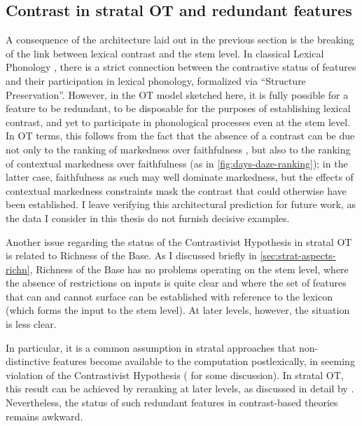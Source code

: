 \subsection{Contrast in stratal OT and redundant features}
\label{sec:contrast-stratal-ot}

A consequence of the architecture laid out in the previous section is the breaking of the link between lexical contrast and the stem level. In classical Lexical Phonology \citep{kiparsky82:_lexic_phonol_morph,kiparsky85:_some_lexic_phonol,kiparsky95}, there is a strict connection between the contrastive status of features and their participation in lexical phonology, formalized via \enquote{Structure Preservation}. However, in the OT model sketched here, it is fully possible for a feature to be redundant, \ie to be disposable for the purposes of establishing lexical contrast, and yet to participate in phonological processes even at the stem level. In OT terms, this follows from the fact that the absence of a contrast can be due not only to the ranking of markedness over faithfulness \citep{bermudez-otero07:_marked}, but also to the ranking of contextual markedness over faithfulness (as in \cref{fig:days-daze-ranking}); in the latter case, faithfulness as such may well dominate markedness, but the effects of contextual markedness constraints mask the contrast that could otherwise have been established. I leave verifying this architectural prediction for future work, as the data I consider in this thesis do not furnish decisive examples.

Another issue regarding the status of the Contrastivist Hypothesis in stratal OT is related to Richness of the Base. As I discussed briefly in \cref{sec:strat-aspects-richn}, Richness of the Base has no problems operating on the stem level, where the absence of restrictions on inputs is quite clear and where the set of features that can and cannot surface can be established with reference to the lexicon (which forms the input to the stem level). At later levels, however, the situation is less clear.

In particular, it is a common assumption in stratal approaches that non\hyp distinctive features become available to the computation postlexically, in seeming violation of the Contrastivist Hypothesis (\cf \citealp{radisic09:_serbian} for some discussion). In stratal OT, this result can be achieved by reranking at later levels, as discussed in detail by \textcite{bermudez-otero07:_marked}. Nevertheless, the status of such redundant features in contrast\hyp based theories remains awkward.

